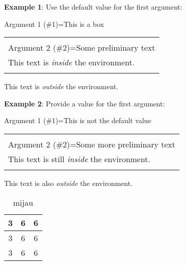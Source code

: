 \documentclass{article}
\newenvironment{mijau}[2][This is a box]
    {\begin{center}
    Argument 1 (\#1)=#1\\[1ex]
    \begin{tabular}{|p{0.9\textwidth}|}
    \hline\\
    Argument 2 (\#2)=#2\\[2ex]
    }
    { 
    \\\\\hline
    \end{tabular} 
    \end{center}
    }
\newenvironment{magic}[3]
    {\begin{table}
    \centering
    \caption{#1}
    \label{#2}
    \begin{tabular}{|*{#3}{c|}}
        \hline
    }
    {\end{tabular}
    \end{table}
    }
\begin{document}
\textbf{Example 1}: Use the default value for the first argument:
 
\begin{mijau}{Some preliminary text}
This text is \textit{inside} the environment.
\end{mijau}

This text is \textit{outside} the environment.

\vskip12pt

\textbf{Example 2}: Provide a value for the first argument:
 
\begin{mijau}[This is not the default value]{Some more preliminary text}
This text is still \textit{inside} the environment.
\end{mijau}

This text is also \textit{outside} the environment.

\begin{magic}{mijau}{tab:3}{3}
    3 & 6 & 6 \\\hline
    3 & 6 & 6 \\\hline
    3 & 6 & 6 \\\hline
\end{magic}
\end{document}
